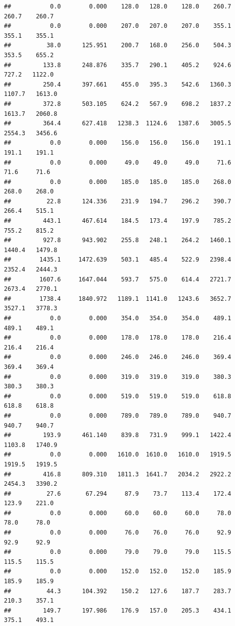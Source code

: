 \documentclass[
]{article}
\begin{document}
\begin{verbatim}
##           0.0        0.000    128.0   128.0    128.0    260.7    260.7    260.7
##           0.0        0.000    207.0   207.0    207.0    355.1    355.1    355.1
##          38.0      125.951    200.7   168.0    256.0    504.3    353.5    655.2
##         133.8      248.876    335.7   290.1    405.2    924.6    727.2   1122.0
##         250.4      397.661    455.0   395.3    542.6   1360.3   1107.7   1613.0
##         372.8      503.105    624.2   567.9    698.2   1837.2   1613.7   2060.8
##         364.4      627.418   1238.3  1124.6   1387.6   3005.5   2554.3   3456.6
##           0.0        0.000    156.0   156.0    156.0    191.1    191.1    191.1
##           0.0        0.000     49.0    49.0     49.0     71.6     71.6     71.6
##           0.0        0.000    185.0   185.0    185.0    268.0    268.0    268.0
##          22.8      124.336    231.9   194.7    296.2    390.7    266.4    515.1
##         443.1      467.614    184.5   173.4    197.9    785.2    755.2    815.2
##         927.8      943.902    255.8   248.1    264.2   1460.1   1440.4   1479.8
##        1435.1     1472.639    503.1   485.4    522.9   2398.4   2352.4   2444.3
##        1607.6     1647.044    593.7   575.0    614.4   2721.7   2673.4   2770.1
##        1738.4     1840.972   1189.1  1141.0   1243.6   3652.7   3527.1   3778.3
##           0.0        0.000    354.0   354.0    354.0    489.1    489.1    489.1
##           0.0        0.000    178.0   178.0    178.0    216.4    216.4    216.4
##           0.0        0.000    246.0   246.0    246.0    369.4    369.4    369.4
##           0.0        0.000    319.0   319.0    319.0    380.3    380.3    380.3
##           0.0        0.000    519.0   519.0    519.0    618.8    618.8    618.8
##           0.0        0.000    789.0   789.0    789.0    940.7    940.7    940.7
##         193.9      461.140    839.8   731.9    999.1   1422.4   1103.8   1740.9
##           0.0        0.000   1610.0  1610.0   1610.0   1919.5   1919.5   1919.5
##         416.8      809.310   1811.3  1641.7   2034.2   2922.2   2454.3   3390.2
##          27.6       67.294     87.9    73.7    113.4    172.4    123.9    221.0
##           0.0        0.000     60.0    60.0     60.0     78.0     78.0     78.0
##           0.0        0.000     76.0    76.0     76.0     92.9     92.9     92.9
##           0.0        0.000     79.0    79.0     79.0    115.5    115.5    115.5
##           0.0        0.000    152.0   152.0    152.0    185.9    185.9    185.9
##          44.3      104.392    150.2   127.6    187.7    283.7    210.3    357.1
##         149.7      197.986    176.9   157.0    205.3    434.1    375.1    493.1

\end{verbatim}
\end{document}
